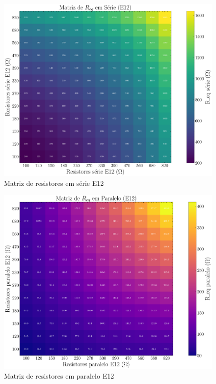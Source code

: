 \documentclass[conference]{IEEEtran}
\begin{document}
\begin{figure}[htbp]
    \centering
    \caption{Matriz de resistores em série E12}
    \label{fig:matriz_serie_e12}
    \includegraphics[width=0.8\linewidth]{figures/matriz_serie_e12.pdf}
\end{figure}

\begin{figure}[htbp]
    \centering
    \caption{Matriz de resistores em paralelo E12}
    \label{fig:matriz_paralelo_e12}
    \includegraphics[width=0.8\linewidth]{figures/matriz_paralelo_e12.pdf}
\end{figure}


\end{document}
